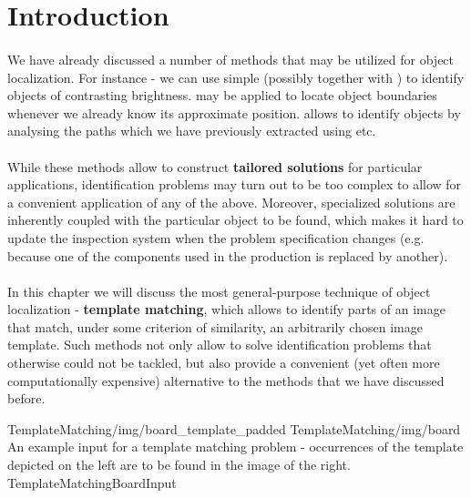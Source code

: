\section{Introduction}

\paragraph*{}
We have already discussed a number of methods that may be utilized for object localization. For instance - we can use simple  (possibly together with ) to identify objects of contrasting brightness.  may be applied to locate object boundaries whenever we already know its approximate position.  allows to identify objects by analysing the paths which we have previously extracted using  etc.

\paragraph*{}
While these methods allow to construct \textbf{tailored solutions} for particular applications, identification problems may turn out to be too complex to allow for a convenient application of any of the above. Moreover, specialized solutions are inherently coupled with the particular object to be found, which makes it hard to update the inspection system when the problem specification changes (e.g. because one of the components used in the production is replaced by another).

\paragraph*{}
In this chapter we will discuss the most general-purpose technique of object localization - \textbf{template matching}, which allows to identify parts of an image that match, under some criterion of similarity, an arbitrarily chosen image template. Such methods not only allow to solve identification problems that otherwise could not be tackled, but also provide a convenient (yet often more computationally expensive) alternative to the methods that we have discussed before. 

\twoFigures
{TemplateMatching/img/board_template_padded}
{TemplateMatching/img/board}
{An example input for a template matching problem - occurrences of the template depicted on the left are to be found in the image of the right.}
{TemplateMatchingBoardInput}
{\basicWidth}

